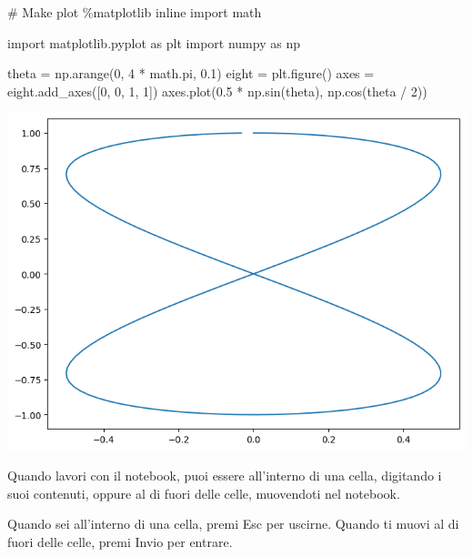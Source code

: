 \documentclass[
  letterpaper,
  krantz2]{{[}./krantz{]}}
\newenvironment{Shaded}{\begin{snugshade}}{\end{snugshade}}
\newcommand{\CommentTok}[1]{\textcolor[rgb]{0.37,0.37,0.37}{#1}}
\newcommand{\DecValTok}[1]{\textcolor[rgb]{0.68,0.00,0.00}{#1}}
\newcommand{\FloatTok}[1]{\textcolor[rgb]{0.68,0.00,0.00}{#1}}
\newcommand{\ImportTok}[1]{\textcolor[rgb]{0.00,0.46,0.62}{#1}}
\newcommand{\NormalTok}[1]{\textcolor[rgb]{0.00,0.23,0.31}{#1}}
\newcommand{\OperatorTok}[1]{\textcolor[rgb]{0.37,0.37,0.37}{#1}}
\begin{document}
\begin{Shaded}
\begin{Highlighting}[]
\CommentTok{\# Make plot}
\OperatorTok{\%}\NormalTok{matplotlib inline}
\ImportTok{import}\NormalTok{ math}

\ImportTok{import}\NormalTok{ matplotlib.pyplot }\ImportTok{as}\NormalTok{ plt}
\ImportTok{import}\NormalTok{ numpy }\ImportTok{as}\NormalTok{ np}

\NormalTok{theta }\OperatorTok{=}\NormalTok{ np.arange(}\DecValTok{0}\NormalTok{, }\DecValTok{4} \OperatorTok{*}\NormalTok{ math.pi, }\FloatTok{0.1}\NormalTok{)}
\NormalTok{eight }\OperatorTok{=}\NormalTok{ plt.figure()}
\NormalTok{axes }\OperatorTok{=}\NormalTok{ eight.add\_axes([}\DecValTok{0}\NormalTok{, }\DecValTok{0}\NormalTok{, }\DecValTok{1}\NormalTok{, }\DecValTok{1}\NormalTok{])}
\NormalTok{axes.plot(}\FloatTok{0.5} \OperatorTok{*}\NormalTok{ np.sin(theta), np.cos(theta }\OperatorTok{/} \DecValTok{2}\NormalTok{))}
\end{Highlighting}
\end{Shaded}

\includegraphics{chapters/python/00_prelims_files/figure-pdf/cell-2-output-1.png}

Quando lavori con il notebook, puoi essere all'interno di una cella,
digitando i suoi contenuti, oppure al di fuori delle celle, muovendoti
nel notebook.

Quando sei all'interno di una cella, premi Esc per uscirne. Quando ti
muovi al di fuori delle celle, premi Invio per entrare.
\end{document}
